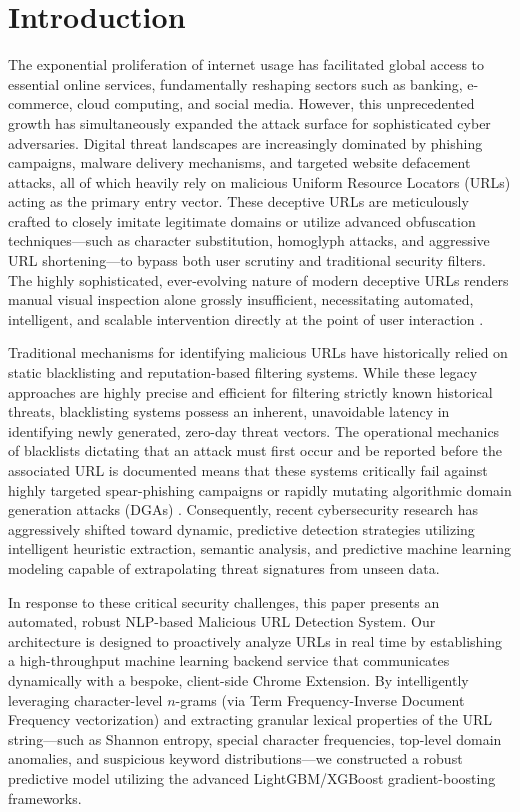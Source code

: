 \documentclass[conference]{IEEEtran}
\begin{document}
\section{Introduction}
The exponential proliferation of internet usage has facilitated global access to essential online services, fundamentally reshaping sectors such as banking, e-commerce, cloud computing, and social media. However, this unprecedented growth has simultaneously expanded the attack surface for sophisticated cyber adversaries. Digital threat landscapes are increasingly dominated by phishing campaigns, malware delivery mechanisms, and targeted website defacement attacks, all of which heavily rely on malicious Uniform Resource Locators (URLs) acting as the primary entry vector. These deceptive URLs are meticulously crafted to closely imitate legitimate domains or utilize advanced obfuscation techniques—such as character substitution, homoglyph attacks, and aggressive URL shortening—to bypass both user scrutiny and traditional security filters. The highly sophisticated, ever-evolving nature of modern deceptive URLs renders manual visual inspection alone grossly insufficient, necessitating automated, intelligent, and scalable intervention directly at the point of user interaction \cite{abirami2024holistic}.

Traditional mechanisms for identifying malicious URLs have historically relied on static blacklisting and reputation-based filtering systems. While these legacy approaches are highly precise and efficient for filtering strictly known historical threats, blacklisting systems possess an inherent, unavoidable latency in identifying newly generated, zero-day threat vectors. The operational mechanics of blacklists dictating that an attack must first occur and be reported before the associated URL is documented means that these systems critically fail against highly targeted spear-phishing campaigns or rapidly mutating algorithmic domain generation attacks (DGAs) \cite{jaiswal2023malicious}. Consequently, recent cybersecurity research has aggressively shifted toward dynamic, predictive detection strategies utilizing intelligent heuristic extraction, semantic analysis, and predictive machine learning modeling capable of extrapolating threat signatures from unseen data.

In response to these critical security challenges, this paper presents an automated, robust NLP-based Malicious URL Detection System. Our architecture is designed to proactively analyze URLs in real time by establishing a high-throughput machine learning backend service that communicates dynamically with a bespoke, client-side Chrome Extension. By intelligently leveraging character-level $n$-grams (via Term Frequency-Inverse Document Frequency vectorization) and extracting granular lexical properties of the URL string—such as Shannon entropy, special character frequencies, top-level domain anomalies, and suspicious keyword distributions—we constructed a robust predictive model utilizing the advanced LightGBM/XGBoost gradient-boosting frameworks. 
\end{document}
